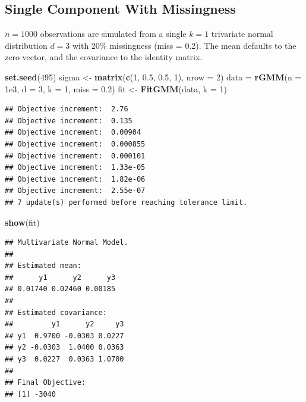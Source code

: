 \documentclass[12pt]{article}
\newenvironment{Shaded}{\begin{snugshade}}{\end{snugshade}}
\newcommand{\AttributeTok}[1]{\textcolor[rgb]{0.13,0.29,0.53}{#1}}
\newcommand{\DecValTok}[1]{\textcolor[rgb]{0.00,0.00,0.81}{#1}}
\newcommand{\FloatTok}[1]{\textcolor[rgb]{0.00,0.00,0.81}{#1}}
\newcommand{\FunctionTok}[1]{\textcolor[rgb]{0.13,0.29,0.53}{\textbf{#1}}}
\newcommand{\NormalTok}[1]{#1}
\newcommand{\OtherTok}[1]{\textcolor[rgb]{0.56,0.35,0.01}{#1}}
\begin{document}
\hypertarget{single-component-with-missingness}{%
\subsection{Single Component With
Missingness}\label{single-component-with-missingness}}

\(n = 1000\) observations are simulated from a single \(k = 1\)
trivariate normal distribution \(d = 3\) with 20\% missingness (miss =
0.2). The mean defaults to the zero vector, and the covariance to the
identity matrix.

\begin{Shaded}
\begin{Highlighting}[]
\FunctionTok{set.seed}\NormalTok{(}\DecValTok{495}\NormalTok{)}
\NormalTok{sigma }\OtherTok{\textless{}{-}} \FunctionTok{matrix}\NormalTok{(}\FunctionTok{c}\NormalTok{(}\DecValTok{1}\NormalTok{, }\FloatTok{0.5}\NormalTok{, }\FloatTok{0.5}\NormalTok{, }\DecValTok{1}\NormalTok{), }\AttributeTok{nrow =} \DecValTok{2}\NormalTok{)}
\NormalTok{data }\OtherTok{=} \FunctionTok{rGMM}\NormalTok{(}\AttributeTok{n =} \FloatTok{1e3}\NormalTok{, }\AttributeTok{d =} \DecValTok{3}\NormalTok{, }\AttributeTok{k =} \DecValTok{1}\NormalTok{, }\AttributeTok{miss =} \FloatTok{0.2}\NormalTok{)}
\NormalTok{fit }\OtherTok{\textless{}{-}} \FunctionTok{FitGMM}\NormalTok{(data, }\AttributeTok{k =} \DecValTok{1}\NormalTok{)}
\end{Highlighting}
\end{Shaded}

\begin{verbatim}
## Objective increment:  2.76 
## Objective increment:  0.135 
## Objective increment:  0.00904 
## Objective increment:  0.000855 
## Objective increment:  0.000101 
## Objective increment:  1.33e-05 
## Objective increment:  1.82e-06 
## Objective increment:  2.55e-07 
## 7 update(s) performed before reaching tolerance limit.
\end{verbatim}

\begin{Shaded}
\begin{Highlighting}[]
\FunctionTok{show}\NormalTok{(fit)}
\end{Highlighting}
\end{Shaded}

\begin{verbatim}
## Multivariate Normal Model. 
## 
## Estimated mean:
##      y1      y2      y3 
## 0.01740 0.02460 0.00185 
## 
## Estimated covariance:
##         y1      y2     y3
## y1  0.9700 -0.0303 0.0227
## y2 -0.0303  1.0400 0.0363
## y3  0.0227  0.0363 1.0700
## 
## Final Objective:
## [1] -3040
\end{verbatim}
\end{document}
